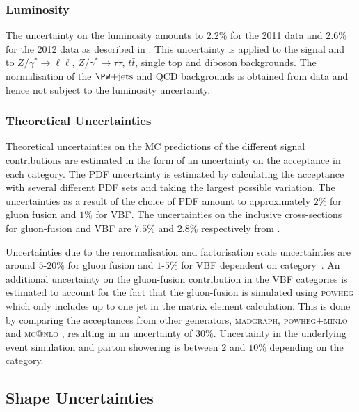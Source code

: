 \subsubsection{\textbf{Luminosity}} 
The uncertainty on the luminosity amounts to $2.2\%$ for the 2011 data and
$2.6\%$ for the 2012 data as described in \cite{CMS-PAS-SMP-12-008,CMS-PAS-LUM-13-001}.
This uncertainty is applied to the signal and to $Z/\gamma^{*} \to \ell\ell$, $Z/\gamma^{*} \to
\tau\tau$, $t \bar{t}$, single top and diboson backgrounds. 
The normalisation of the $\WJets$ and QCD backgrounds is obtained from data and hence not subject to the luminosity uncertainty.

\subsubsection{\textbf{Theoretical Uncertainties}} 
Theoretical uncertainties on the \ac{MC} predictions of the different signal
contributions are estimated in the form of an uncertainty on the acceptance in
each category. The \ac{PDF} uncertainty is estimated by calculating the
acceptance with several different \ac{PDF} sets and taking the largest possible
variation. The uncertainties as a result of the choice of \ac{PDF} amount to
approximately $2\%$ for gluon fusion and $1\%$ for \ac{VBF}. The uncertainties
on the inclusive cross-sections for gluon-fusion and \ac{VBF} are $7.5\%$ and
$2.8\%$ respectively from
\cite{LHCHiggsCrossSectionWorkingGroup:2011ti,Dittmaier:2012vm,Heinemeyer:2013tqa}.

Uncertainties due to the renormalisation and factorisation scale uncertainties
are around $5$-$20\%$ for gluon fusion and $1$-$5\%$ for \ac{VBF} dependent on
category~\cite{HIG-13-004}. An additional uncertainty on the gluon-fusion contribution in the
VBF categories is estimated to account for the fact that the gluon-fusion is
simulated using \textsc{powheg} which only includes up to one jet in the matrix
element calculation. This is done by comparing the acceptances from other
generators, \textsc{madgraph}, \textsc{powheg+minlo} \cite{Hamilton:2012np} and
\textsc{mc@nlo} \cite{Frixione:2002ik}, resulting in an uncertainty of $30\%$.
Uncertainty in the underlying event simulation and parton showering is between
$2$ and $10\%$ depending on the category. 


\subsection{Shape Uncertainties}
\label{sec:systematicUncertainties_shape}

